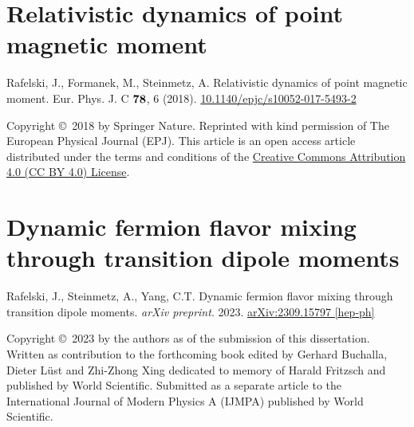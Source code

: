 %

\chapter{Relativistic dynamics of point magnetic moment}
\label{appendixC}
\begin{center}
Rafelski, J., Formanek, M., Steinmetz, A. Relativistic dynamics of point magnetic moment. Eur. Phys. J. C $\boldsymbol{78}$, 6 (2018). \href{https://doi.org/10.1140/epjc/s10052-017-5493-2}{10.1140/epjc/s10052-017-5493-2}
\end{center}

\noindent Copyright \copyright\ 2018 by Springer Nature. Reprinted with kind permission of The European Physical Journal (EPJ). This article is an open access article distributed under the terms and conditions of the \href{https://creativecommons.org/licenses/by/4.0/}{Creative Commons Attribution 4.0 (CC BY 4.0) License}.

%

\chapter{Dynamic fermion flavor mixing through transition dipole moments}
\label{appendixD}
\begin{center}
Rafelski, J., Steinmetz, A., Yang, C.T. Dynamic fermion flavor mixing through transition dipole moments. \emph{arXiv preprint}. 2023. \href{https://arxiv.org/abs/2309.15797}{arXiv:2309.15797 [hep-ph]}
\end{center}

\noindent Copyright \copyright\ 2023 by the authors as of the submission of this dissertation. Written as contribution to the forthcoming book edited by Gerhard Buchalla, Dieter L\"ust
and Zhi-Zhong Xing dedicated to memory of Harald Fritzsch and published by World Scientific. Submitted as a separate article to the International Journal of Modern Physics A (IJMPA) published by World Scientific.

%

